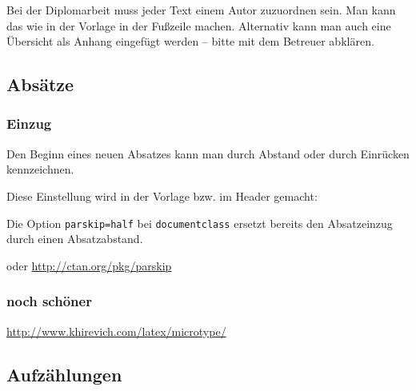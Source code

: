 Bei der Diplomarbeit muss jeder Text einem Autor zuzuordnen sein. Man
kann das wie in der Vorlage in der Fußzeile machen. Alternativ kann man
auch eine Übersicht als Anhang eingefügt werden -- bitte mit dem
Betreuer abklären.

\hypertarget{absuxe4tze}{%
\subsection{Absätze}\label{absuxe4tze}}

\hypertarget{einzug}{%
\subsubsection{Einzug}\label{einzug}}

Den Beginn eines neuen Absatzes kann man durch Abstand oder durch
Einrücken kennzeichnen.

Diese Einstellung wird in der Vorlage bzw. im Header gemacht:

\begin{Shaded}
\begin{Highlighting}[]
\CommentTok{%\textbackslash{}parindent0pt % auskommentieren, wenn keine Einrueckung der }
               \CommentTok{% ersten Absatzzeile gewuenscht}
\CommentTok{%\textbackslash{}parskip1.5ex plus0.5ex minus0.5ex % flexibler Absatzabstand}
\end{Highlighting}
\end{Shaded}

Die Option \texttt{parskip=half} bei \texttt{documentclass} ersetzt
bereits den Absatzeinzug durch einen Absatzabstand.

oder \url{http://ctan.org/pkg/parskip}

\begin{Shaded}
\begin{Highlighting}[]
\NormalTok{[parfill]\{}\NormalTok{\}}
\end{Highlighting}
\end{Shaded}

\hypertarget{noch-schuxf6ner}{%
\subsubsection{noch schöner}\label{noch-schuxf6ner}}

\url{http://www.khirevich.com/latex/microtype/}

\hypertarget{aufzuxe4hlungen}{%
\subsection{Aufzählungen}\label{aufzuxe4hlungen}}


